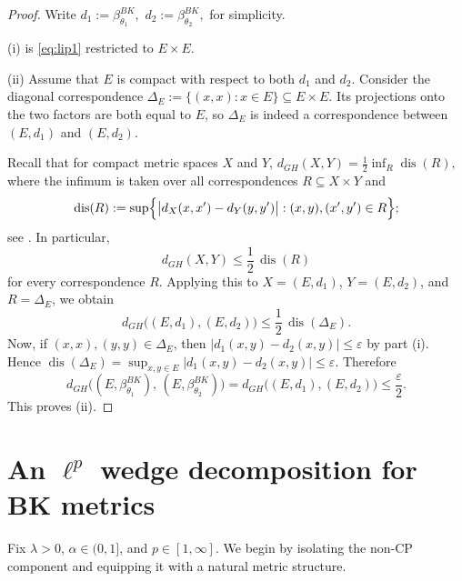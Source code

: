 \documentclass[11pt]{amsart}
\theoremstyle{definition}
\theoremstyle{remark}
\newcommand{\1}{\mathbbm{1}}
\begin{document}
\begin{proof}
Write $d_1:=\beta^{BK}_{\theta_1},$ $d_2:=\beta^{BK}_{\theta_2},$ for simplicity.

(i) is \eqref{eq:lip1} restricted to $E\times E$.

(ii)  Assume that $E$ is compact with respect to both $d_1$ and $d_2$. Consider the diagonal correspondence $\Delta_E:=\{(x,x):x\in E\}\subseteq E\times E.$
Its projections onto the two factors are both equal to $E$, so $\Delta_E$ is indeed a correspondence between $(E,d_1)$ and $(E,d_2)$.

Recall that for compact metric spaces $X$ and $Y$, $d_{GH}(X,Y)=\frac12\inf_R \operatorname{dis}(R),$
where the infimum is taken over all correspondences $R\subseteq X\times Y$ and
\[\operatorname{dis}(R):=
\sup\Bigl\{\bigl|d_X(x,x')-d_Y(y,y')\bigr|:(x,y),(x',y')\in R\Bigr\};
\]
see \cite[Theorem~7.3.25]{BBI}. In particular,
\[
d_{GH}(X,Y)\le \frac12\,\operatorname{dis}(R)
\]
for every correspondence $R$. Applying this to $X=(E,d_1)$, $Y=(E,d_2)$, and $R=\Delta_E$, we obtain
\[
d_{GH}\bigl((E,d_1),(E,d_2)\bigr)
\le
\frac12\,\operatorname{dis}(\Delta_E).
\]
Now, if $(x,x),(y,y)\in \Delta_E$, then $\bigl|d_1(x,y)-d_2(x,y)\bigr|\le \varepsilon$
by part (i). Hence $\operatorname{dis}(\Delta_E)
=
\sup_{x,y\in E}\bigl|d_1(x,y)-d_2(x,y)\bigr|
\le \varepsilon.$
Therefore
\[
d_{GH}\bigl((E,\beta^{BK}_{\theta_1}),\,(E,\beta^{BK}_{\theta_2})\bigr)
=
d_{GH}\bigl((E,d_1),(E,d_2)\bigr)
\le
\frac{\varepsilon}{2}.
\]
This proves (ii).
\end{proof}



\section{An \texorpdfstring{$\ell^p$}{lp} wedge decomposition for BK metrics}

Fix $\lambda>0$, $\alpha\in(0,1]$, and $p\in[1,\infty]$. We begin by isolating the non-CP component and equipping it with a natural metric structure.
\end{document}

